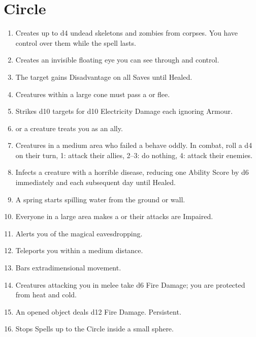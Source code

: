 \documentclass[itdr]{subfiles}
\begin{document}

\vfill
\break

\section{ Circle}
\def \spellcircle {4}
\begin{enumerate}
	\item {} Creates up to d4 undead skeletons and zombies from corpses. You have \mbox{control} over them while the spell lasts.
	\item {} Creates an invisible floating eye you can see through and control.
	\item {} The target gains Disadvantage on all Saves until Healed.
	\item {} Creatures within a large cone must pass a  or flee.
	\item {} Strikes d10 targets for d10 Electricity Damage each ignoring Armour.
	\item {}  or a creature treats you as an ally.
	\item {} Creatures in a medium area who failed a  behave oddly. In combat, roll a d4 on their turn, 1: attack their allies, 2--3: do nothing, 4: attack their enemies.
	\item {} Infects a creature with a \mbox{horrible} disease, reducing one Ability Score by d6 immediately and each subsequent day until Healed.
	\item {} A spring starts spilling water from the ground or wall.
	\item {} Everyone in a large area makes a  or their attacks are Impaired.
	\item {} Alerts you of the magical eavesdropping.
	\item {} Teleports you within a medium distance.
	\item {} Bars extradimensional movement.
	\item {} Creatures attacking you in melee take d6 Fire Damage; you are protected from heat and cold.
	\item {} An opened object deals d12 Fire Damage. Persistent.
	\item {} Stops Spells up to the  Circle inside a small sphere.

\end{enumerate}
\end{document}

